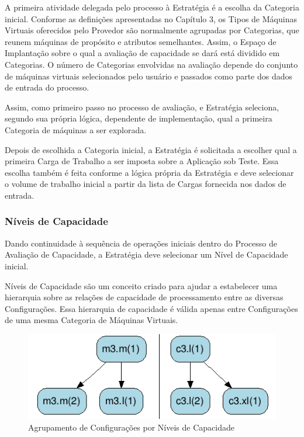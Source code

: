 A primeira atividade delegada pelo processo à Estratégia é a escolha da Categoria 
inicial. Conforme as definições apresentadas no Capítulo 3, os Tipos de Máquinas
Virtuais oferecidos pelo Provedor são normalmente agrupadas por Categorias, que
reunem máquinas de propósito e atributos semelhantes. Assim, o Espaço de Implantação
sobre o qual a avaliação de capacidade se dará está dividido em Categorias. O número 
de Categorias envolvidas na avaliação depende do conjunto de máquinas virtuais
selecionados pelo usuário e passados como parte dos dados de entrada do processo.

Assim, como primeiro passo no processo de avaliação, e Estratégia seleciona, 
segundo sua própria lógica, dependente de implementação, qual a primeira
Categoria de máquinas a ser explorada.

Depois de escolhida a Categoria inicial, a Estratégia é solicitada a escolher 
qual a primeira Carga de Trabalho a ser imposta sobre a Aplicação sob Teste. Essa 
escolha também é feita conforme a lógica própria da Estratégia e deve selecionar
o volume de trabalho inicial a partir da lista de Cargas fornecida nos dados de 
entrada.

\subsubsection{Níveis de Capacidade}
Dando continuidade à sequência de operações iniciais dentro do Processo de Avaliação 
de Capacidade, a Estratégia deve selecionar um Nível de Capacidade inicial. 

Níveis de Capacidade são um conceito criado para ajudar a estabelecer uma hierarquia 
sobre as relações de capacidade de processamento entre as diversas Configurações. 
Essa hierarquia de capacidade é válida apenas entre Configurações de uma mesma 
Categoria de Máquinas Virtuais. 

\begin{figure}[hbt]
  \caption{\label{fig_niveis_capacidade}Agrupamento de Configurações por Níveis de Capacidade}
  \begin{center}
    \includegraphics{img/exemplo-niveis-capacidade}
  \end{center}
\end{figure}

